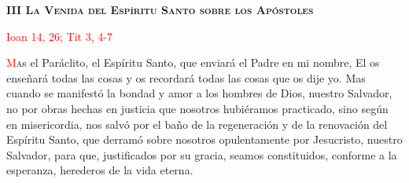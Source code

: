 \begin{center}
    \textbf{\textsc{III La Venida del Espíritu Santo sobre los Apóstoles}}
    
    \textcolor{red}{Ioan 14, 26; Tit 3, 4-7}
\end{center}


\vspace{0.25em}

\lettrine[lines=2]{\textcolor{red}{M}}as el Paráclito, el Espíritu Santo, que enviará el Padre en mi nombre, El os enseñará todas las cosas y os recordará todas las cosas que os dije yo.
Mas cuando se manifestó la bondad y amor a los hombres de Dios, nuestro Salvador, no por obras hechas en justicia que nosotros hubiéramos practicado, sino según en misericordia, nos
salvó por el baño de la regeneración y de la renovación del Espíritu Santo, que derramó sobre nosotros opulentamente por Jesucristo, nuestro Salvador, para que, justificados por su
gracia, seamos constituidos, conforme a la esperanza, herederos de la vida eterna.
